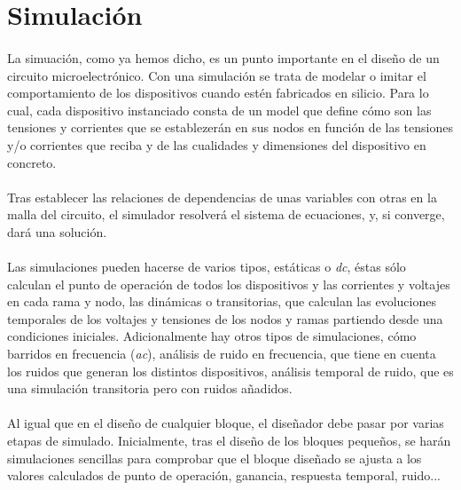 \section{Simulación}\label{cap:simulacion}

\paragraph{}
La simuación, como ya hemos dicho, es un punto importante en el diseño de un circuito
microelectrónico. Con una simulación se trata de modelar o imitar el comportamiento
de los dispositivos cuando estén fabricados en silicio. Para lo cual, cada
dispositivo instanciado consta de un model que define cómo son las tensiones y
corrientes que se establezerán en sus nodos en función de las tensiones y/o
corrientes que reciba y de las cualidades y dimensiones del dispositivo en concreto.

\paragraph{}
Tras establecer las relaciones de dependencias de unas variables con otras en la malla
del circuito, el simulador resolverá el sistema de ecuaciones, y, si converge, dará
una solución.

\paragraph{}
Las simulaciones pueden hacerse de varios tipos, estáticas o \textit{dc}, éstas
sólo calculan el punto de operación de todos los dispositivos y las corrientes y
voltajes en cada rama y nodo, las dinámicas o transitorias, que calculan las
evoluciones temporales de los voltajes y tensiones de los nodos y ramas partiendo
desde una condiciones iniciales. Adicionalmente hay otros tipos de simulaciones,
cómo barridos en frecuencia (\textit{ac}), análisis de ruido en frecuencia, que
tiene en cuenta los ruidos que generan los distintos dispositivos, análisis temporal
de ruido, que es una simulación transitoria pero con ruidos añadidos.

\paragraph{}
Al igual que en el diseño de cualquier bloque, el diseñador debe pasar por varias
etapas de simulado. Inicialmente, tras el diseño de los bloques pequeños, se harán
simulaciones sencillas para comprobar que el bloque diseñado se ajusta a los valores
calculados de punto de operación, ganancia, respuesta temporal, ruido...

